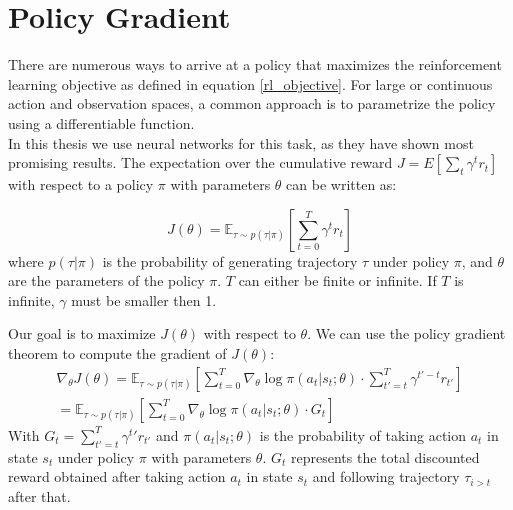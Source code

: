 \section{Policy Gradient}
There are numerous ways to arrive at a policy that maximizes the reinforcement learning objective as defined in equation 
\ref{rl_objective}. For large or continuous action and observation spaces, a common approach is 
to parametrize the policy using a differentiable function.\\ 
In this thesis we use neural networks for this task, as they have shown most promising results. The expectation over the cumulative 
reward $J = E[\sum_{t} \gamma^t r_t]$ with respect to a policy $\pi$ with parameters $\theta$ can be written as:

\begin{equation}
J(\theta) = \mathbb{E}_{\tau \sim p(\tau | \pi)} \left[ \sum_{t=0}^T \gamma^t r_t \right]
\end{equation}
where  $p(\tau | \pi)$ is the probability of generating trajectory $\tau$ under policy $\pi$, and $\theta$ are the parameters of the policy $\pi$. 
$T$ can either be finite or infinite. If $T$ is infinite, $\gamma$ must be smaller then 1.

Our goal is to maximize $J(\theta)$ with respect to $\theta$. We can use the policy gradient theorem to compute the gradient of $J(\theta)$:
\begin{equation}
    \label{nabla_reinforce}
    \begin{aligned}
        \nabla_{\theta} J(\theta) = \mathbb{E}_{\tau \sim p(\tau | \pi)} \left[ \sum_{t=0}^T \nabla_{\theta} \log \pi(a_t|s_t;\theta) \cdot \sum_{t'=t}^T \gamma^{t'-t} r_{t'} \right]\\
        = \mathbb{E}_{\tau \sim p(\tau | \pi)} \left[ \sum_{t=0}^T \nabla_{\theta} \log \pi(a_t|s_t;\theta) \cdot  G_t\right]
    \end{aligned}
\end{equation}
With $G_t = \sum_{t'=t}^T \gamma^t' r_{t'}$ and $\pi(a_t|s_t;\theta)$ is the probability of taking action $a_t$ in state $s_t$ under policy $\pi$ with parameters $\theta$. 
$G_t$ represents the total discounted reward obtained after taking action $a_t$ in state $s_t$ and following trajectory $\tau_{i>t}$ after that.

